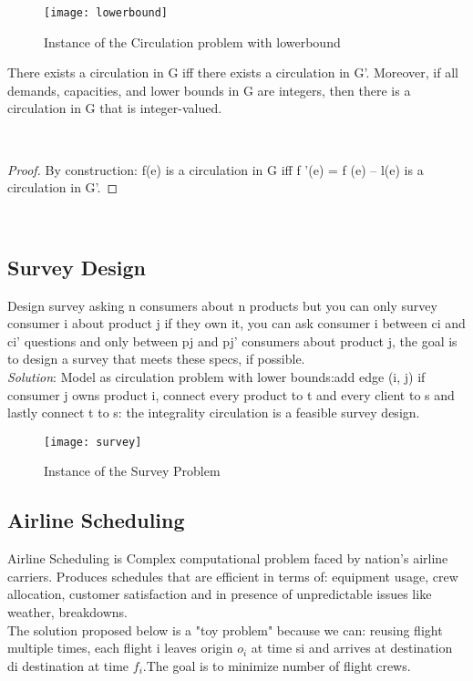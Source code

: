 \begin{figure}[H]
    \centering
    \texttt{[image: lowerbound]}
    \caption{Instance of the Circulation problem with lowerbound}
\end{figure}

\begin{claim}
    There exists a circulation in G iff there exists a circulation in G'. Moreover, if all demands, capacities, and lower bounds in G are integers, then there is a circulation in G that is integer-valued.
\end{claim}\\

\begin{proof}
    By construction: f(e) is a circulation in G iff f '(e) = f (e) – l(e) is a circulation in G'.
\end{proof}\\

\subsection{Survey Design}

Design survey asking n consumers about n products but you can only survey consumer i about product j if they own it, you can ask consumer i between ci and ci' questions and only between pj and pj' consumers about product j, the goal is to design a survey that meets these specs, if possible.\\

\emph{Solution}: Model as circulation problem with lower bounds:add edge (i, j) if consumer j owns product i, connect every product to t and every client to s and lastly connect t to s: the integrality circulation is a feasible survey design.

\begin{figure}[H]
    \centering
    \texttt{[image: survey]}
    \caption{Instance of the Survey Problem}
\end{figure}

\subsection{Airline Scheduling}

Airline Scheduling is Complex computational problem faced by nation's airline carriers. Produces schedules that are efficient in terms of: equipment usage, crew allocation, customer satisfaction
and in presence of unpredictable issues like weather, breakdowns.\\
The solution proposed below is a "toy problem" because we can: reusing flight multiple times, each
flight i leaves origin $o_{i}$ at time si and arrives at destination di destination at time $f_{i}$.The goal is to minimize number of flight crews.

